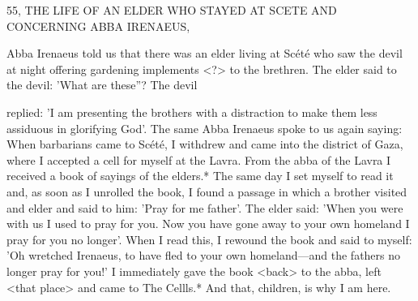 55, THE LIFE OF AN ELDER WHO STAYED AT SCETE
AND CONCERNING ABBA IRENAEUS,

Abba Irenaeus told us that there was an elder living at Scété who
saw the devil at night offering gardening implements <?> to the
brethren.
The elder said to the devil: 'What are these”? The devil

replied: 'I am presenting the brothers with a distraction to make
them less assiduous in glorifying God'.
The same Abba Irenaeus
spoke to us again saying: When barbarians came to Scété, I
withdrew and came into the district of Gaza, where I accepted a cell
for myself at the Lavra.
From the abba of the Lavra I received a
book of sayings of the elders.* The same day I set myself to read it
and, as soon as I unrolled the book, I found a passage in which a
brother visited and elder and said to him: 'Pray for me father'.
The
elder said: 'When you were with us I used to pray for you.
Now you
have gone away to your own homeland I pray for you no longer'.
When I read this, I rewound the book and said to myself: 'Oh
wretched Irenaeus, to have fled to your own homeland—and the
fathers no longer pray for you!' I immediately gave the book
<back> to the abba, left <that place> and came to The Cellls.* And
that, children, is why I am here.

